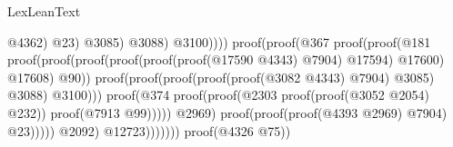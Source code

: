 \begin{lexlean}{LexLeanText}
\begin{coremodule}
                                                                                  @4362)
                                                                                @23)
                                                                              @3085)
                                                                            @3088)
                                                                          @3100))))
                                                              proof(proof(@367
                                                                    proof(proof(@181
                                                                          proof(proof(proof(proof(proof(proof(@17590
                                                                                        @4343)
                                                                                      @7904)
                                                                                    @17594)
                                                                                  @17600)
                                                                                @17608)
                                                                              @90))
                                                                        proof(proof(proof(proof(proof(@3082
                                                                                    @4343)
                                                                                  @7904)
                                                                                @3085)
                                                                              @3088)
                                                                            @3100)))
                                                                  proof(@374
                                                                      proof(proof(@2303
                                                                            proof(proof(@3052 @2054)
                                                                                @232))
                                                                          proof(@7913 @99)))))
                                                            @2969)
                                                          proof(proof(proof(@4393 @2969) @7904)
                                                              @23)))))
                                                @2092)
                                              @12723)))))))
                              proof(@4326 @75))

\end{coremodule}
\end{lexlean}
